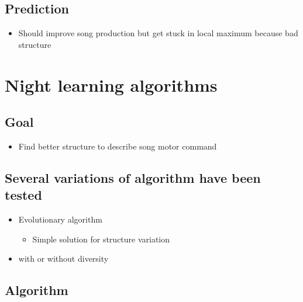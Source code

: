 \subsection{Prediction}\label{prediction}

\begin{itemize}
\tightlist
\item
  Should improve song production but get stuck in local maximum because
  bad structure
\end{itemize}

\section{Night learning algorithms}\label{night-learning-algorithms}

\subsection{Goal}\label{goal-1}

\begin{itemize}
\tightlist
\item
  Find better structure to describe song motor command
\end{itemize}

\subsection{Several variations of algorithm have been
tested}\label{several-variations-of-algorithm-have-been-tested}

\begin{itemize}
\tightlist
\item
  Evolutionary algorithm

  \begin{itemize}
  \tightlist
  \item
    Simple solution for structure variation
  \end{itemize}
\item
  with or without diversity
\end{itemize}

\subsection{Algorithm}\label{algorithm}

